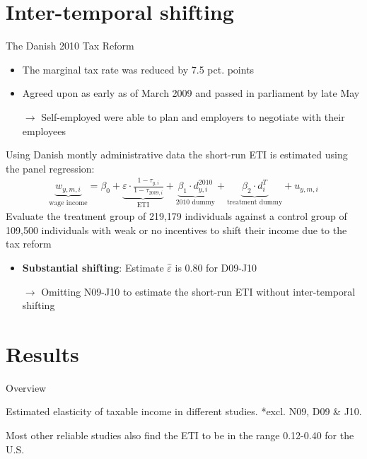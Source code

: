 \documentclass[8pt]{beamer}
\begin{document}
\section{Inter-temporal shifting}


\begin{frame}{\citet{kreiner2016tax}}
  The Danish 2010 Tax Reform
  \begin{itemize}
    \item The marginal tax rate was reduced by 7.5 pct. points
    \item Agreed upon as early as  of March 2009 and passed in parliament by late May
    \item[$\rightarrow$] Self-employed were able to plan and employers to negotiate with their employees
  \end{itemize}
  Using Danish montly administrative data the short-run ETI is estimated using the panel regression: \begin{align}
    \underbrace{w_{y,m,i}}_\text{wage income} = \beta_0 + \underbrace{\varepsilon\cdot\frac{1-\tau_{y,i}}{1-\tau_{2009,i}}}_\text{ETI} + \underbrace{\beta_1\cdot d_{y,i}^{2010}}_\text{2010 dummy} + \underbrace{\beta_2\cdot d_i^T}_\text{treatment dummy} + u_{y,m,i}
    \label{eq:wage}
  \end{align}
  Evaluate the treatment group of 219,179 individuals against a control group of 109,500 individuals with weak or no incentives to shift their income due to the tax reform
  \begin{itemize}
    \item \textbf{Substantial shifting}: Estimate $\hat{\varepsilon}$ is 0.80 for D09-J10
    \item[$\rightarrow$] Omitting N09-J10 to estimate the short-run ETI without inter-temporal shifting
  \end{itemize}
\end{frame}


\section{Results}


\begin{frame}{Overview}
  \begin{table}
    \centering
    \footnotesize
    
    \caption{Estimated elasticity of taxable income in different studies. *excl. N09, D09 \& J10.}
    \label{tab:elasticities}
  \end{table}
  Most other reliable studies also find the ETI to be in the range 0.12-0.40 for the U.S. \citep{saez2012elasticity}
\end{frame}
\end{document}
